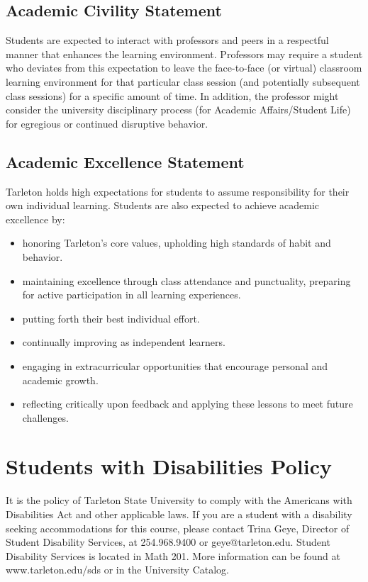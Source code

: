 \documentclass[10pt]{article}
\begin{document}
\subsection*{Academic Civility Statement}
\label{sec:org414f891}
Students are expected to interact with professors and peers in a respectful manner that enhances the learning environment. Professors may require a student who deviates from this expectation to leave the face-to-face (or virtual) classroom learning environment for that particular class session (and potentially subsequent class sessions) for a specific amount of time. In addition, the professor might consider the university disciplinary process (for Academic Affairs/Student Life) for egregious or continued disruptive behavior.

\subsection*{Academic Excellence Statement}
\label{sec:org532e9ea}
Tarleton holds high expectations for students to assume responsibility for their own individual learning. Students are also expected to achieve academic excellence by:
\begin{itemize}
\item honoring Tarleton’s core values, upholding high standards of habit and behavior.
\item maintaining excellence through class attendance and punctuality, preparing for active participation in all learning experiences.
\item putting forth their best individual effort.
\item continually improving as independent learners.
\item engaging in extracurricular opportunities that encourage personal and academic growth.
\item reflecting critically upon feedback and applying these lessons to meet future challenges.
\end{itemize}

\section*{Students with Disabilities Policy}
\label{sec:org9a6be25}

It is the policy of Tarleton State University to comply with the Americans
with Disabilities Act and other applicable laws. If you are a student with a
disability seeking accommodations for this course, please contact Trina
Geye, Director of Student Disability Services, at 254.968.9400 or
geye@tarleton.edu. Student Disability Services is
located in Math 201. More information can be found at www.tarleton.edu/sds or in the University Catalog.
\end{document}
